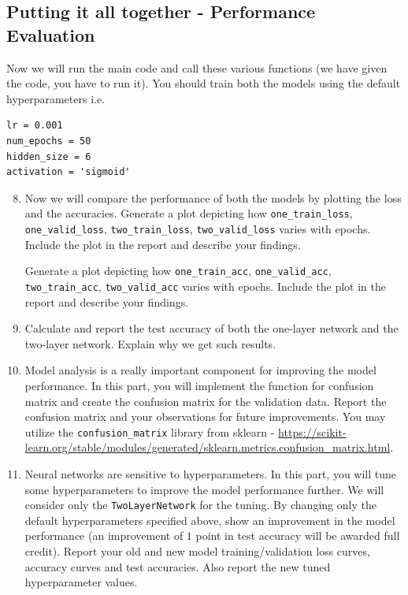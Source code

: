 \subsection{Putting it all together - Performance Evaluation }

Now we will run the main code and call these various functions (we have given the code, you have to run it). You should train both the models using the default hyperparameters i.e.

\begin{verbatim}
lr = 0.001
num_epochs = 50
hidden_size = 6
activation = 'sigmoid'
\end{verbatim}

\begin{enumerate}
\setcounter{enumi}{7}

\item {}
Now we will compare the performance of both the models by plotting the loss and the accuracies. Generate a plot depicting how \verb|one_train_loss|, \verb|one_valid_loss|, \verb|two_train_loss|, \verb|two_valid_loss| varies with epochs. Include the plot in the report and describe your findings.

Generate a plot depicting how \verb|one_train_acc|, \verb|one_valid_acc|, \verb|two_train_acc|, \verb|two_valid_acc| varies with epochs. Include the plot in the report and describe your findings.

\item {}
Calculate and report the test accuracy of both the one-layer network and the two-layer network. Explain why we get such results.

\item {}
Model analysis is a really important component for improving the model performance. In this part, you will implement the function for confusion matrix and create the confusion matrix for the validation data. Report the confusion matrix and your observations for future improvements. You may utilize the \verb|confusion_matrix| library from sklearn - \url{https://scikit-learn.org/stable/modules/generated/sklearn.metrics.confusion_matrix.html}.

\item {}
Neural networks are sensitive to hyperparameters. In this part, you will tune some hyperparameters to improve the model performance further. We will consider only the \verb|TwoLayerNetwork| for the tuning. By changing only the default hyperparameters specified above, show an improvement in the model performance (an improvement of $1$ point in test accuracy will be awarded full credit). Report your old and new model training/validation loss curves, accuracy curves and test accuracies. Also report the new tuned hyperparameter values. 

\end{enumerate}